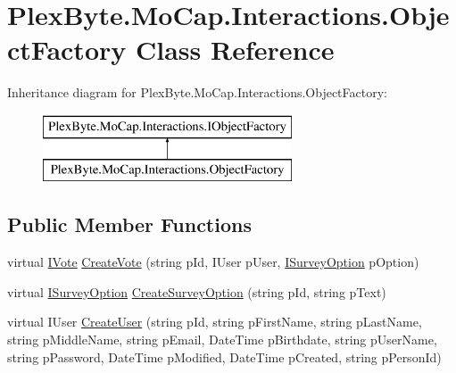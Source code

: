 \hypertarget{class_plex_byte_1_1_mo_cap_1_1_interactions_1_1_object_factory}{}\section{Plex\+Byte.\+Mo\+Cap.\+Interactions.\+Object\+Factory Class Reference}
\label{class_plex_byte_1_1_mo_cap_1_1_interactions_1_1_object_factory}
Inheritance diagram for Plex\+Byte.\+Mo\+Cap.\+Interactions.\+Object\+Factory\+:\begin{figure}[H]
\begin{center}
\leavevmode
\includegraphics[height=2.000000cm]{class_plex_byte_1_1_mo_cap_1_1_interactions_1_1_object_factory}
\end{center}
\end{figure}
\subsection*{Public Member Functions}
\begin{DoxyCompactItemize}
\item 
virtual \hyperlink{interface_plex_byte_1_1_mo_cap_1_1_interactions_1_1_i_vote}{I\+Vote} \hyperlink{class_plex_byte_1_1_mo_cap_1_1_interactions_1_1_object_factory_a5e26c538cb579f1a31798ce1ae6a4c2f}{Create\+Vote} (string p\+Id, I\+User p\+User, \hyperlink{interface_plex_byte_1_1_mo_cap_1_1_interactions_1_1_i_survey_option}{I\+Survey\+Option} p\+Option)
\item 
virtual \hyperlink{interface_plex_byte_1_1_mo_cap_1_1_interactions_1_1_i_survey_option}{I\+Survey\+Option} \hyperlink{class_plex_byte_1_1_mo_cap_1_1_interactions_1_1_object_factory_ad3a9a100069f91f229baa9bfe1a1205a}{Create\+Survey\+Option} (string p\+Id, string p\+Text)
\item 
virtual I\+User \hyperlink{class_plex_byte_1_1_mo_cap_1_1_interactions_1_1_object_factory_add6cc462c161e617c99f76512fb359dd}{Create\+User} (string p\+Id, string p\+First\+Name, string p\+Last\+Name, string p\+Middle\+Name, string p\+Email, Date\+Time p\+Birthdate, string p\+User\+Name, string p\+Password, Date\+Time p\+Modified, Date\+Time p\+Created, string p\+Person\+Id)
\end{DoxyCompactItemize}


